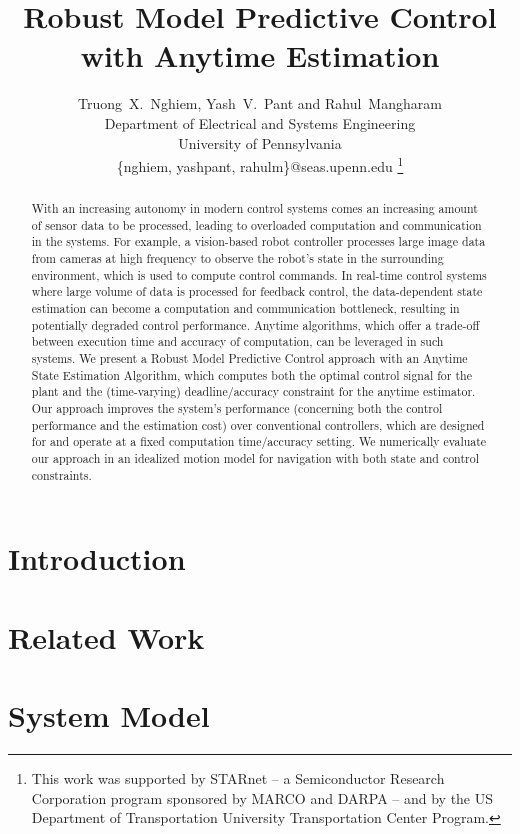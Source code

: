 \documentclass[letterpaper, 10pt, conference]{ieeeconf}
\title{Robust Model Predictive Control with Anytime Estimation}
\author{Truong~X.~Nghiem, Yash~V.~Pant and Rahul~Mangharam \\
Department of Electrical and Systems Engineering\\ University of Pennsylvania
\\ \{nghiem, yashpant, rahulm\}@seas.upenn.edu %
\thanks{This work was supported by STARnet -- a Semiconductor Research Corporation program sponsored by MARCO and DARPA -- and %
by the US Department of Transportation University Transportation Center Program.}
}
\begin{document}
\maketitle

\begin{abstract}
With an increasing autonomy in modern control systems %
comes an increasing amount of sensor data to be processed, leading to overloaded computation and communication in the systems.
For example, a vision-based robot controller processes large image data from cameras at high frequency to observe the robot's state in the surrounding environment, which is used to compute control commands.
In real-time control systems where large volume of data is processed for feedback control, the data-dependent state estimation can become a computation and communication bottleneck, resulting in potentially degraded control performance.
Anytime algorithms, which offer a trade-off between execution time and accuracy of computation, can be leveraged in such systems.
We present a Robust Model Predictive Control approach with an Anytime State Estimation Algorithm, %
which computes both the optimal control signal for the plant and the (time-varying) deadline/accuracy constraint for the anytime estimator.
Our approach improves the system's performance (concerning both the control performance and the estimation cost) over conventional controllers, which are designed for and operate at a fixed computation time/accuracy setting.
We numerically evaluate our approach in an idealized motion model for navigation with both state and control constraints.
\end{abstract}

\section{Introduction}


\section{Related Work} \label{sec:related}


\section{System Model} \label{sec:model}

\end{document}

